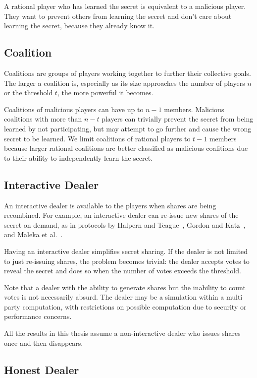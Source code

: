\documentclass[12pt]{dalcsthesis}
\begin{document}
A rational player who has learned the secret is equivalent to a malicious player. They want to prevent others from learning the secret and don't care about learning the secret, because they already know it.

\subsection{Coalition}

Coalitions are groups of players working together to further their collective goals. The larger a coalition is, especially as its size approaches the number of players $n$ or the threshold $t$, the more powerful it becomes.

Coalitions of malicious players can have up to $n-1$ members. Malicious coalitions with more than $n-t$ players can trivially prevent the secret from being learned by not participating, but may attempt to go further and cause the wrong secret to be learned. We limit coalitions of rational players to $t-1$ members because larger rational coalitions are better classified as malicious coalitions due to their ability to independently learn the secret.

\subsection{Interactive Dealer}

An interactive dealer is available to the players when shares are being recombined. For example, an interactive dealer can re-issue new shares of the secret on demand, as in protocols by Halpern and Teague~\cite{halpern04}, Gordon and Katz~\cite{gordon06}, and Maleka et al.~\cite{maleka08}.

Having an interactive dealer simplifies secret sharing. If the dealer is not limited to just re-issuing shares, the problem becomes trivial: the dealer accepts votes to reveal the secret and does so when the number of votes exceeds the threshold.

Note that a dealer with the ability to generate shares but the inability to count votes is not necessarily absurd. The dealer may be a simulation within a multi party computation, with restrictions on possible computation due to security or performance concerns.

All the results in this thesis assume a non-interactive dealer who issues shares once and then disappears.

\subsection{Honest Dealer}
\end{document}
